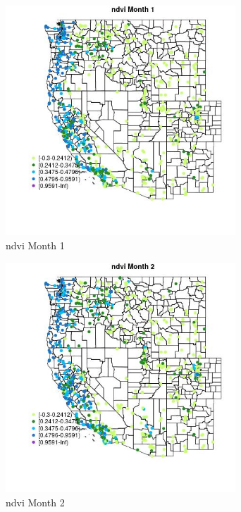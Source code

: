 \begin{figure} 
\centering  
\includegraphics[width=0.77\textwidth]{Code_Outputs/Report_ML_input_PM25_Step4_part_e_de_duplicated_aves_compiled_2019-05-21wNAs_MapObsMo1ndvi.jpg} 
\caption{\label{fig:Report_ML_input_PM25_Step4_part_e_de_duplicated_aves_compiled_2019-05-21wNAsMapObsMo1ndvi}ndvi Month 1} 
\end{figure} 
 

\begin{figure} 
\centering  
\includegraphics[width=0.77\textwidth]{Code_Outputs/Report_ML_input_PM25_Step4_part_e_de_duplicated_aves_compiled_2019-05-21wNAs_MapObsMo2ndvi.jpg} 
\caption{\label{fig:Report_ML_input_PM25_Step4_part_e_de_duplicated_aves_compiled_2019-05-21wNAsMapObsMo2ndvi}ndvi Month 2} 
\end{figure} 
 

